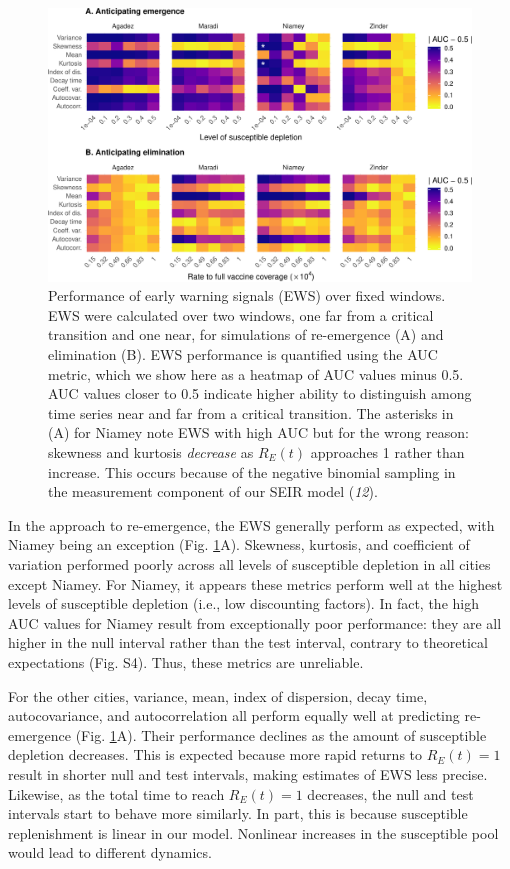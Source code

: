 \documentclass[3p]{elsarticle} %
\makeatletter
\def\maxwidth{\ifdim\Gin@nat@width>\linewidth\linewidth
\else\Gin@nat@width\fi}
\let\Oldincludegraphics\includegraphics
\renewcommand{\includegraphics}[1]{\Oldincludegraphics[width=\maxwidth]{#1}}
\makeatother
\begin{document}
\begin{figure}
\centering
\includegraphics{measles-ews-manuscript_files/figure-latex/aucs-1.pdf}
\caption{Performance of early warning signals (EWS) over fixed windows.
EWS were calculated over two windows, one far from a critical transition
and one near, for simulations of re-emergence (A) and elimination (B).
EWS performance is quantified using the AUC metric, which we show here
as a heatmap of AUC values minus 0.5. AUC values closer to 0.5 indicate
higher ability to distinguish among time series near and far from a
critical transition. The asterisks in (A) for Niamey note EWS with high
AUC but for the wrong reason: skewness and kurtosis \emph{decrease} as
\(R_E(t)\) approaches 1 rather than increase. This occurs because of the
negative binomial sampling in the measurement component of our SEIR
model (\emph{12}). \label{aucs}}
\end{figure}

In the approach to re-emergence, the EWS generally perform as expected,
with Niamey being an exception (Fig. \ref{aucs}A). Skewness, kurtosis,
and coefficient of variation performed poorly across all levels of
susceptible depletion in all cities except Niamey. For Niamey, it
appears these metrics perform well at the highest levels of susceptible
depletion (i.e., low discounting factors). In fact, the high AUC values
for Niamey result from exceptionally poor performance: they are all
higher in the null interval rather than the test interval, contrary to
theoretical expectations (Fig. S4). Thus, these metrics are unreliable.

For the other cities, variance, mean, index of dispersion, decay time,
autocovariance, and autocorrelation all perform equally well at
predicting re-emergence (Fig. \ref{aucs}A). Their performance declines
as the amount of susceptible depletion decreases. This is expected
because more rapid returns to \(R_E(t)=1\) result in shorter null and
test intervals, making estimates of EWS less precise. Likewise, as the
total time to reach \(R_E(t)=1\) decreases, the null and test intervals
start to behave more similarly. In part, this is because susceptible
replenishment is linear in our model. Nonlinear increases in the
susceptible pool would lead to different dynamics.
\end{document}
